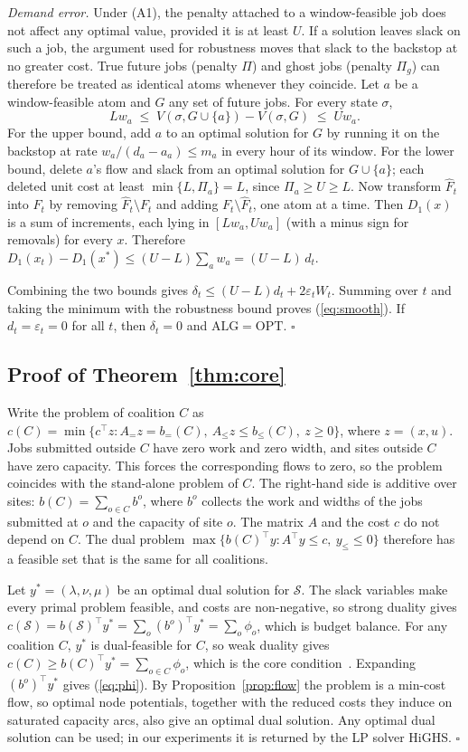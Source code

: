 \emph{Demand error.} Under (A1), the penalty attached to a window-feasible job does not affect any optimal value, provided it is at least $U$. If a solution leaves slack on such a job, the argument used for robustness moves that slack to the backstop at no greater cost. True future jobs (penalty $\Pi$) and ghost jobs (penalty $\Pi_g$) can therefore be treated as identical atoms whenever they coincide. Let $a$ be a window-feasible atom and $G$ any set of future jobs. For every state $\sigma$,
\[
Lw_a\;\le\;V(\sigma,G\cup\{a\})-V(\sigma,G)\;\le\;Uw_a.
\]
For the upper bound, add $a$ to an optimal solution for $G$ by running it on the backstop at rate $w_a/(d_a-a_a)\le m_a$ in every hour of its window. For the lower bound, delete $a$'s flow and slack from an optimal solution for $G\cup\{a\}$; each deleted unit cost at least $\min\{L,\Pi_a\}=L$, since $\Pi_a\ge U\ge L$. Now transform $\hat F_t$ into $F_t$ by removing $\hat F_t\setminus F_t$ and adding $F_t\setminus\hat F_t$, one atom at a time. Then $D_1(x)$ is a sum of increments, each lying in $[Lw_a,Uw_a]$ (with a minus sign for removals) for every $x$. Therefore $D_1(x_t)-D_1(x^*)\le(U-L)\sum_aw_a=(U-L)\,d_t$.

Combining the two bounds gives $\delta_t\le(U-L)d_t+2\varepsilon_tW_t$. Summing over $t$ and taking the minimum with the robustness bound proves (\ref{eq:smooth}). If $d_t=\varepsilon_t=0$ for all $t$, then $\delta_t=0$ and $\mathrm{ALG}=\mathrm{OPT}$. \hfill$\square$

\subsection{Proof of Theorem~\ref{thm:core}}

Write the problem of coalition $C$ as $c(C)=\min\{c^\top z: A_{=}z=b_{=}(C),\ A_{\le}z\le b_{\le}(C),\ z\ge 0\}$, where $z=(x,u)$. Jobs submitted outside $C$ have zero work and zero width, and sites outside $C$ have zero capacity. This forces the corresponding flows to zero, so the problem coincides with the stand-alone problem of $C$. The right-hand side is additive over sites: $b(C)=\sum_{o\in C}b^o$, where $b^o$ collects the work and widths of the jobs submitted at $o$ and the capacity of site $o$. The matrix $A$ and the cost $c$ do not depend on $C$. The dual problem $\max\{b(C)^\top y: A^\top y\le c,\ y_{\le}\le 0\}$ therefore has a feasible set that is the same for all coalitions.

Let $y^*=(\lambda,\nu,\mu)$ be an optimal dual solution for $\mathcal S$. The slack variables make every primal problem feasible, and costs are non-negative, so strong duality gives $c(\mathcal S)=b(\mathcal S)^\top y^*=\sum_o(b^o)^\top y^*=\sum_o\phi_o$, which is budget balance. For any coalition $C$, $y^*$ is dual-feasible for $C$, so weak duality gives $c(C)\ge b(C)^\top y^*=\sum_{o\in C}\phi_o$, which is the core condition~\cite{owen1975core}. Expanding $(b^o)^\top y^*$ gives (\ref{eq:phi}). By Proposition~\ref{prop:flow} the problem is a min-cost flow, so optimal node potentials, together with the reduced costs they induce on saturated capacity arcs, also give an optimal dual solution. Any optimal dual solution can be used; in our experiments it is returned by the LP solver HiGHS. \hfill$\square$
